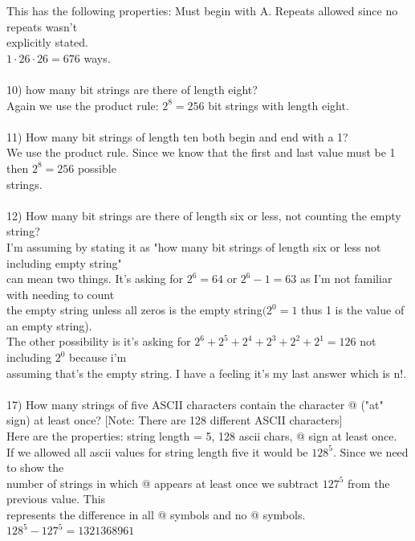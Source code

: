 \documentclass{article}
\begin{document}
\begin{flushleft}
\setlength\parindent{24pt}This has the following properties: Must begin with A.  Repeats allowed since no repeats wasn't \\explicitly stated. \\
\setlength\parindent{24pt}$1 \cdot 26 \cdot 26 = 676$ ways. \\
~\\
\setlength\parindent{0pt}10) how many bit strings are there of length eight? \\
\setlength\parindent{24pt}Again we use the product rule: $2^8 = 256$ bit strings with length eight. \\
~\\
\setlength\parindent{0pt}11) How many bit strings of length ten both begin and end with a 1? \\ 
\setlength\parindent{24pt}We use the product rule.  Since we know that the first and last value must be 1 then $2^8 = 256$ possible \\strings. \\
~\\
\setlength\parindent{0pt}12) How many bit strings are there of length six or less, not counting the empty string? \\
\setlength\parindent{24pt} I'm assuming by stating it as "how many bit strings of length six or less not including empty string" \\can mean two things.  It's asking for $2^6 = 64$ or $2^6 - 1 = 63$ as I'm not familiar with needing to count \\the empty string unless all zeros is the empty string$(2^0 = 1$ thus 1 is the value of an empty string).  \\The other possibility is it's asking for $2^6 + 2^5 + 2^4 + 2^3 + 2^2 + 2^1 = 126$ not including $2^0$ because i'm \\assuming that's the empty string.  I have a feeling it's my last answer which is n!.  \\
~\\
\setlength\parindent{0pt}17) How many strings of five ASCII characters contain the character @ ("at" sign) at least once? [Note: There are 128 different ASCII characters] \\
\setlength\parindent{24pt}Here are the properties: string length = 5, 128 ascii chars, @ sign at least once.  \\
\setlength\parindent{24pt}If we allowed all ascii values for string length five it would be $128^5$.  Since we need to show the \\number of strings in which @ appears at least once we subtract $127^5$ from the previous value.  This \\represents the difference in all @ symbols and no @ symbols.  $128^5 - 127^5 = 1321368961$ \\

\end{flushleft}
\end{document}
